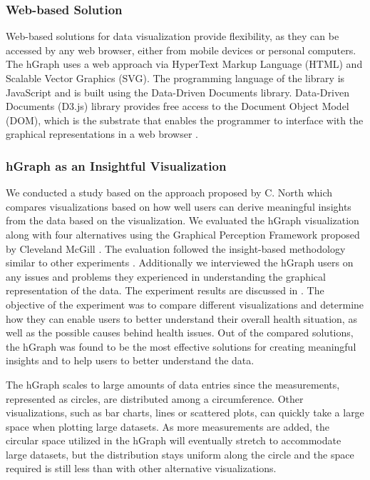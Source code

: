 \documentclass[twocolumn]{bmcart}%
\begin{document}
\subsubsection*{Web-based Solution}

Web-based solutions for data visualization provide flexibility, as they can be accessed by any web browser, either from mobile devices or personal computers. The hGraph uses a web approach via HyperText Markup Language (HTML) and Scalable Vector Graphics (SVG). The programming language of the library is JavaScript and is built using the Data-Driven Documents library. Data-Driven Documents (D3.js) library provides free access to the Document Object Model (DOM), which is the substrate that enables the programmer to interface with the graphical representations in a web browser \cite{bostock2011d3}.

\subsubsection*{hGraph as an Insightful Visualization}
We conducted a study based on the approach proposed by C. North \cite{north2006toward} which compares visualizations based on how well users can derive meaningful insights from the data based on the visualization. We evaluated the hGraph visualization along with four alternatives using the Graphical Perception Framework proposed by Cleveland McGill \cite{cleveland1984graphical}. The evaluation followed the insight-based methodology similar to other experiments \cite{saraiya2004evaluation}. Additionally we interviewed the hGraph users on any issues and problems they experienced in understanding the graphical representation of the data. The experiment results are discussed in \cite{EMBCLedNiem}. The objective of the experiment was to compare different visualizations and determine how they can enable users to better understand their overall health situation, as well as the possible causes behind health issues. Out of the compared solutions, the hGraph was found to be the most effective solutions for creating meaningful insights and to help users to better understand the data.



The hGraph scales to large amounts of data entries since the measurements, represented as circles, are distributed among a circumference. Other visualizations, such as bar charts, lines or scattered plots, can quickly take a large space when plotting large datasets. As more measurements are added, the circular space utilized in the hGraph will eventually stretch to accommodate large datasets, but the distribution stays uniform along the circle and the space required is still less than with other alternative visualizations.
\end{document}
